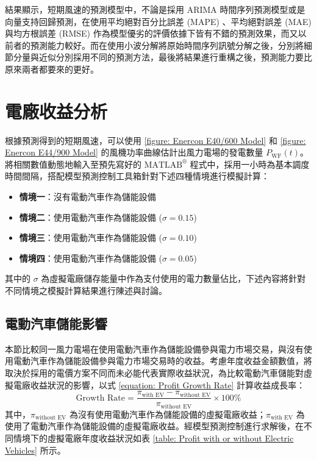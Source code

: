 結果顯示，短期風速的預測模型中，不論是採用 ARIMA 時間序列預測模型或是向量支持回歸預測，在使用平均絕對百分比誤差 (MAPE) 、平均絕對誤差 (MAE) 與均方根誤差 (RMSE) 作為模型優劣的評價依據下皆有不錯的預測效果，而又以前者的預測能力較好。而在使用小波分解將原始時間序列訊號分解之後，分別將細節分量與近似分別採用不同的預測方法，最後將結果進行重構之後，預測能力要比原來兩者都要來的更好。

\section{電廠收益分析}

根據預測得到的短期風速，可以使用 \ref{figure: Enercon E40/600 Model} 和 \ref{figure: Enercon E44/900 Model} 的風機功率曲線估計出風力電場的發電數量 $P_{\text{WF}}(t)$。將相關數值動態地輸入至預先寫好的 $\text{MATLAB}^{®}$ 程式中，採用一小時為基本調度時間間隔，搭配模型預測控制工具箱針對下述四種情境進行模擬計算：
%
\begin{itemize}
  \item \textbf{情境一}：沒有電動汽車作為儲能設備
  \item \textbf{情境二}：使用電動汽車作為儲能設備 ($\sigma = 0.15$) 
  \item \textbf{情境三}：使用電動汽車作為儲能設備 ($\sigma = 0.10$) 
  \item \textbf{情境四}：使用電動汽車作為儲能設備 ($\sigma = 0.05$) 
\end{itemize}
%
其中的 $\sigma$ 為虛擬電廠儲存能量中作為支付使用的電力數量佔比，下述內容將針對不同情境之模擬計算結果進行陳述與討論。

\subsection{電動汽車儲能影響}

本節比較同一風力電場在使用電動汽車作為儲能設備參與電力市場交易，與沒有使用電動汽車作為儲能設備參與電力市場交易時的收益。考慮年度收益金額數值，將取決於採用的電價方案不同而未必能代表實際收益狀況，為比較電動汽車儲能對虛擬電廠收益狀況的影響，以式 \eqref{equation: Profit Growth Rate} 計算收益成長率：
\begin{equation}\label{equation: Profit Growth Rate}
  \text{Growth Rate} = \frac{\pi_{\text{with EV}} - \pi_{\text{without EV}}}{\pi_{\text{without EV}}} \times 100 \%
\end{equation}
%
其中，$\pi_{\text{without EV}}$ 為沒有使用電動汽車作為儲能設備的虛擬電廠收益；$\pi_{\text{with EV}}$ 為使用了電動汽車作為儲能設備的虛擬電廠收益。經模型預測控制進行求解後，在不同情境下的虛擬電廠年度收益狀況如表 \ref{table: Profit with or without Electric Vehicles} 所示。

